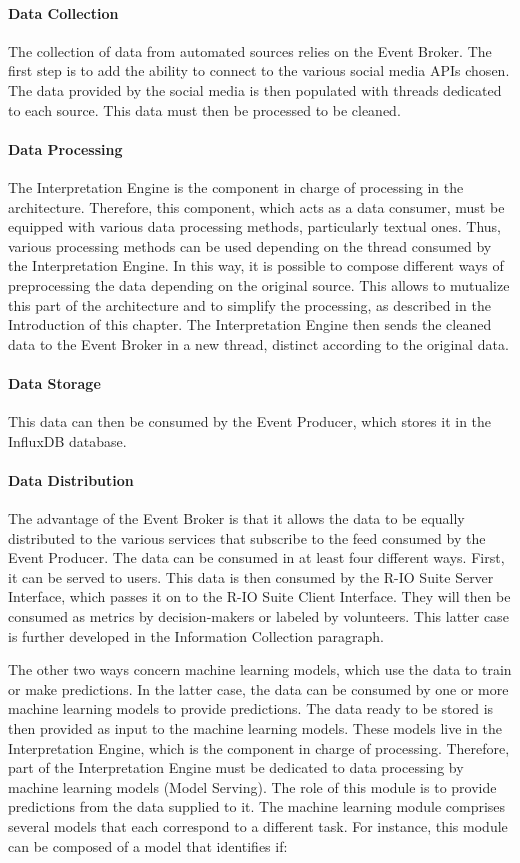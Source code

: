 \paragraph{Data Collection}
The collection of data from automated sources relies on the Event Broker.
The first step is to add the ability to connect to the various social media APIs chosen.
The data provided by the social media is then populated with threads dedicated to each source.
This data must then be processed to be cleaned.
\paragraph{Data Processing}
The Interpretation Engine is the component in charge of processing in the architecture.
Therefore, this component, which acts as a data consumer, must be equipped with various data processing methods, particularly textual ones.
Thus, various processing methods can be used depending on the thread consumed by the Interpretation Engine.
In this way, it is possible to compose different ways of preprocessing the data depending on the original source.
This allows to mutualize this part of the architecture and to simplify the processing, as described in the Introduction of this chapter.
The Interpretation Engine then sends the cleaned data to the Event Broker in a new thread, distinct according to the original data.
\paragraph{Data Storage}
This data can then be consumed by the Event Producer, which stores it in the InfluxDB database.
\paragraph{Data Distribution}
The advantage of the Event Broker is that it allows the data to be equally distributed to the various services that subscribe to the feed consumed by the Event Producer.
The data can be consumed in at least four different ways.
First, it can be served to users.
This data is then consumed by the R-IO Suite Server Interface, which passes it on to the R-IO Suite Client Interface.
They will then be consumed as metrics by decision-makers or labeled by volunteers.
This latter case is further developed in the Information Collection paragraph.

The other two ways concern machine learning models, which use the data to train or make predictions.
In the latter case, the data can be consumed by one or more machine learning models to provide predictions.
The data ready to be stored is then provided as input to the machine learning models.
These models live in the Interpretation Engine, which is the component in charge of processing.
Therefore, part of the Interpretation Engine must be dedicated to data processing by machine learning models (Model Serving).
The role of this module is to provide predictions from the data supplied to it.
The machine learning module comprises several models that each correspond to a different task.
For instance, this module can be composed of a model that identifies if:

